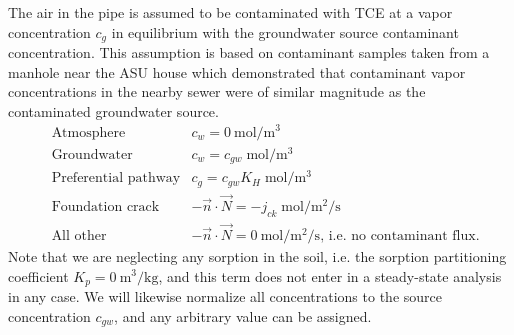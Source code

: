 The air in the pipe is assumed to be contaminated with TCE at a vapor concentration $c_g$ in equilibrium with the groundwater source contaminant concentration.
This assumption is based on contaminant samples taken from a manhole near the ASU house\cite{guo_vapor_2015} which demonstrated that contaminant vapor concentrations in the nearby sewer were of similar magnitude as the contaminated groundwater source.
\begin{align*}
  &\text{Atmosphere} & c_w = \SI{0}{\mol\per\metre\cubed} \\
  &\text{Groundwater} & c_w = c_{gw} \; \si{\mol\per\metre\cubed} \\
  &\text{Preferential pathway} & c_g = c_{gw} K_H \; \si{\mol\per\metre\cubed} \\
  &\text{Foundation crack} & -\vec{n} \cdot \vec{N} = -j_{ck} \; \si{\mol\per\metre\squared\per\second}\\
  &\text{All other} & -\vec{n} \cdot \vec{N} = \SI{0}{\mol\per\metre\squared\per\second} \text{, i.e. no contaminant flux.}
\end{align*}
Note that we are neglecting any sorption in the soil, i.e. the sorption partitioning coefficient $K_p = \SI{0}{\metre\cubed\per\kilo\gram}$, and this term does not enter in a steady-state analysis in any case.
We will likewise normalize all concentrations to the source concentration $c_{gw}$, and any arbitrary value can be assigned.\par
